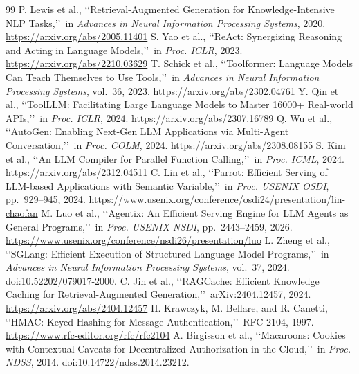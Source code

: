 \documentclass[paper]{ieice}
\begin{document}
\begin{thebibliography}{99}
 P. Lewis et al., \lq\lq Retrieval-Augmented Generation for Knowledge-Intensive NLP Tasks,\rq\rq\ in \emph{Advances in Neural Information Processing Systems}, 2020. \url{https://arxiv.org/abs/2005.11401}
 S. Yao et al., \lq\lq ReAct: Synergizing Reasoning and Acting in Language Models,\rq\rq\ in \emph{Proc. ICLR}, 2023. \url{https://arxiv.org/abs/2210.03629}
 T. Schick et al., \lq\lq Toolformer: Language Models Can Teach Themselves to Use Tools,\rq\rq\ in \emph{Advances in Neural Information Processing Systems}, vol.~36, 2023. \url{https://arxiv.org/abs/2302.04761}
 Y. Qin et al., \lq\lq ToolLLM: Facilitating Large Language Models to Master 16000+ Real-world APIs,\rq\rq\ in \emph{Proc. ICLR}, 2024. \url{https://arxiv.org/abs/2307.16789}
 Q. Wu et al., \lq\lq AutoGen: Enabling Next-Gen LLM Applications via Multi-Agent Conversation,\rq\rq\ in \emph{Proc. COLM}, 2024. \url{https://arxiv.org/abs/2308.08155}
 S. Kim et al., \lq\lq An LLM Compiler for Parallel Function Calling,\rq\rq\ in \emph{Proc. ICML}, 2024. \url{https://arxiv.org/abs/2312.04511}
 C. Lin et al., \lq\lq Parrot: Efficient Serving of LLM-based Applications with Semantic Variable,\rq\rq\ in \emph{Proc. USENIX OSDI}, pp.~929--945, 2024. \url{https://www.usenix.org/conference/osdi24/presentation/lin-chaofan}
 M. Luo et al., \lq\lq Agentix: An Efficient Serving Engine for LLM Agents as General Programs,\rq\rq\ in \emph{Proc. USENIX NSDI}, pp.~2443--2459, 2026. \url{https://www.usenix.org/conference/nsdi26/presentation/luo}
 L. Zheng et al., \lq\lq SGLang: Efficient Execution of Structured Language Model Programs,\rq\rq\ in \emph{Advances in Neural Information Processing Systems}, vol.~37, 2024. doi:10.52202/079017-2000.
 C. Jin et al., \lq\lq RAGCache: Efficient Knowledge Caching for Retrieval-Augmented Generation,\rq\rq\ arXiv:2404.12457, 2024. \url{https://arxiv.org/abs/2404.12457}
 H. Krawczyk, M. Bellare, and R. Canetti, \lq\lq HMAC: Keyed-Hashing for Message Authentication,\rq\rq\ RFC 2104, 1997. \url{https://www.rfc-editor.org/rfc/rfc2104}
 A. Birgisson et al., \lq\lq Macaroons: Cookies with Contextual Caveats for Decentralized Authorization in the Cloud,\rq\rq\ in \emph{Proc. NDSS}, 2014. doi:10.14722/ndss.2014.23212.
\end{thebibliography}
\end{document}
